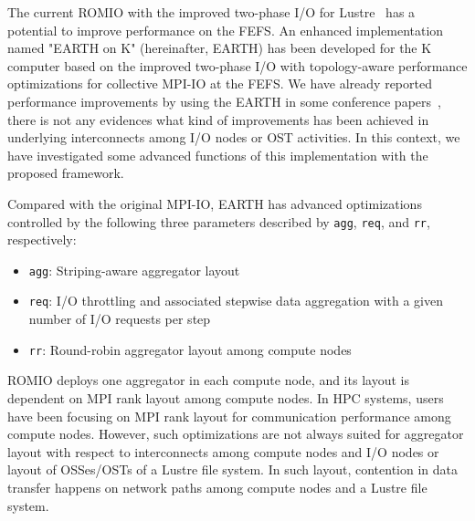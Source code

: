 \documentclass{jhps}
\begin{document}
The current ROMIO with the improved two-phase I/O for Lustre~\cite{lustre-adio:whpaper-2008}
has a potential to improve performance on the FEFS.
An enhanced implementation named "EARTH on K"
(hereinafter, EARTH) has been developed for the K computer
based on the improved two-phase I/O with topology-aware performance optimizations
for collective MPI-IO at the FEFS.
We have already reported performance improvements by using the EARTH
in some conference papers~\cite{tsujita:WS_EuroMPI2014,tsujita:hpcasia18},
there is not any evidences what kind of improvements has been achieved
in underlying interconnects among I/O nodes or OST activities.
In this context, we have investigated some advanced functions of
this implementation with the proposed framework.

Compared with the original MPI-IO, EARTH has advanced optimizations
controlled by the following three parameters described by {\tt agg}, {\tt req},
and {\tt rr}, respectively:
%
\begin{itemize}
\item {\tt agg}: Striping-aware aggregator layout
\item {\tt req}: I/O throttling and associated stepwise data aggregation
with a given number of I/O requests per step
\item {\tt rr}: Round-robin aggregator layout among compute nodes
\end{itemize}
%

ROMIO deploys one aggregator in each compute node, and its layout is dependent on
MPI rank layout among compute nodes.
In HPC systems, users have been focusing on MPI rank layout
for communication performance among compute nodes.
However, such optimizations are not always suited for aggregator layout
with respect to interconnects among compute nodes and I/O nodes
or layout of OSSes/OSTs of a Lustre file system.
In such layout, contention in data transfer happens
on network paths among compute nodes and a Lustre file system.
\end{document}
